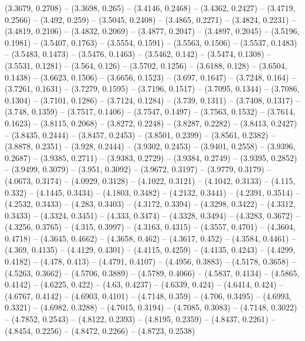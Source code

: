 {  (3.3679, 0.2708) -- (3.3698, 0.265) -- (3.4146, 0.2468) -- (3.4362, 0.2427) --
   (3.4719, 0.2566) -- (3.492, 0.259) -- (3.5045, 0.2408) -- (3.4865, 0.2271) --
   (3.4824, 0.2231) -- (3.4819, 0.2106) -- (3.4832, 0.2069) -- (3.4877, 0.2047) 
  -- (3.4897, 0.2045) -- (3.5196, 0.1981) -- (3.5407, 0.1763) -- (3.5554, 
  0.1591) -- (3.5563, 0.1506) -- (3.5537, 0.1483) -- (3.5483, 0.1473) -- 
  (3.5476, 0.1463) -- (3.5462, 0.142) -- (3.5474, 0.1308) -- (3.5531, 0.1281) --
   (3.564, 0.126) -- (3.5702, 0.1256) -- (3.6188, 0.128) -- (3.6504, 0.1438) -- 
  (3.6623, 0.1506) -- (3.6656, 0.1523) -- (3.697, 0.1647) -- (3.7248, 0.164) -- 
  (3.7261, 0.1631) -- (3.7279, 0.1595) -- (3.7196, 0.1517) -- (3.7095, 0.1344) 
  -- (3.7086, 0.1304) -- (3.7101, 0.1286) -- (3.7124, 0.1284) -- (3.739, 0.1311)
   -- (3.7408, 0.1317) -- (3.748, 0.1359) -- (3.7517, 0.1406) -- (3.7547, 
  0.1497) -- (3.7563, 0.1532) -- (3.7614, 0.1623) -- (3.8115, 0.2068) -- 
  (3.8272, 0.2248) -- (3.8287, 0.2282) -- (3.8413, 0.2427) -- (3.8435, 0.2444) 
  -- (3.8457, 0.2453) -- (3.8501, 0.2399) -- (3.8561, 0.2382) -- (3.8878, 
  0.2351) -- (3.928, 0.2444) -- (3.9302, 0.2453) -- (3.9401, 0.2558) -- (3.9396,
   0.2687) -- (3.9385, 0.2711) -- (3.9383, 0.2729) -- (3.9384, 0.2749) -- 
  (3.9395, 0.2852) -- (3.9499, 0.3079) -- (3.951, 0.3092) -- (3.9672, 0.3197) --
   (3.9779, 0.3179) -- (4.0673, 0.3174) -- (4.0929, 0.3128) -- (4.1022, 0.3121) 
  -- (4.1042, 0.3133) -- (4.115, 0.332) -- (4.1445, 0.3434) -- (4.1803, 0.3482) 
  -- (4.2132, 0.3441) -- (4.2391, 0.3514) -- (4.2532, 0.3433) -- (4.283, 0.3403)
   -- (4.3172, 0.3394) -- (4.3298, 0.3422) -- (4.3312, 0.3433) -- (4.3324, 
  0.3451) -- (4.333, 0.3474) -- (4.3328, 0.3494) -- (4.3283, 0.3672) -- (4.3256,
   0.3765) -- (4.315, 0.3997) -- (4.3163, 0.4315) -- (4.3557, 0.4701) -- 
  (4.3604, 0.4718) -- (4.3645, 0.4662) -- (4.3658, 0.462) -- (4.3617, 0.452) -- 
  (4.3584, 0.4461) -- (4.369, 0.4135) -- (4.4129, 0.4301) -- (4.4115, 0.4259) --
   (4.4135, 0.4243) -- (4.4299, 0.4182) -- (4.478, 0.413) -- (4.4791, 0.4107) --
   (4.4956, 0.3883) -- (4.5178, 0.3658) -- (4.5263, 0.3662) -- (4.5706, 0.3889) 
  -- (4.5789, 0.4066) -- (4.5837, 0.4134) -- (4.5865, 0.4142) -- (4.6225, 0.422)
   -- (4.63, 0.4237) -- (4.6339, 0.424) -- (4.6414, 0.424) -- (4.6767, 0.4142) 
  -- (4.6903, 0.4101) -- (4.7148, 0.359) -- (4.706, 0.3495) -- (4.6993, 0.3321) 
  -- (4.6982, 0.3288) -- (4.7015, 0.3194) -- (4.7085, 0.3083) -- (4.7148, 
  0.3022) -- (4.7852, 0.2543) -- (4.8122, 0.2393) -- (4.8195, 0.2359) -- 
  (4.8437, 0.2261) -- (4.8454, 0.2256) -- (4.8472, 0.2266) -- (4.8723, 0.2538) 
}
